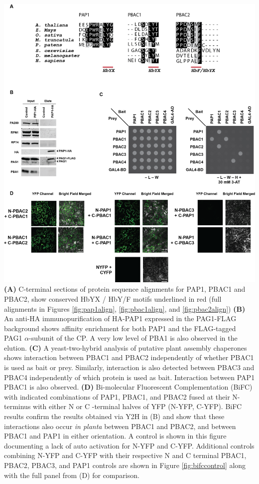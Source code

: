 \begin{FPfigure}
	\centering
	\includegraphics[width=\columnwidth]{Proteasome/papschar.png}
	{\textbf{(A)} C-terminal sections of protein sequence alignments for PAP1, PBAC1 and PBAC2, show conserved HbYX / HbY/F motifs underlined in red (full alignments in Figures \ref{fig:pap1align}, \ref{fig:pbac1align}, and \ref{fig:pbac2align}) \textbf{(B)} An anti-HA immunopurification of HA-PAP1 expressed in the PAG1-FLAG background shows affinity enrichment for both PAP1 and the FLAG-tagged PAG1 $\alpha$-subunit of the CP. A very low level of PBA1 is also observed in the elution. \textbf{(C)} A yeast-two-hybrid analysis of putative plant assembly chaperones shows interaction between PBAC1 and PBAC2 independently of whether PBAC1 is used as bait or prey. Similarly, interaction is also detected between PBAC3 and PBAC4 independently of which protein is used as bait. Interaction between PAP1 PBAC1 is also observed. \textbf{(D)} Bi-molecular Fluorescent Complementation (BiFC) with indicated combinations of PAP1, PBAC1, and PBAC2 fused at their N-terminus with either N or C -terminal halves of YFP (N-YFP, C-YFP). BiFC results confirm the results obtained via Y2H in (B) and show that these interactions also occur \textit{in planta} between PBAC1 and PBAC2, and between PBAC1 and PAP1 in either orientation. A control is shown in this figure documenting a lack of auto activation for N-YFP and C-YFP. Additional controls combining N-YFP and C-YFP with their respective N and C terminal PBAC1, PBAC2, PBAC3, and PAP1 controls are shown in Figure \ref{fig:bifccontrol} along with the full panel from (D) for comparison.}
	\label{fig:papschar}
\end{FPfigure}


